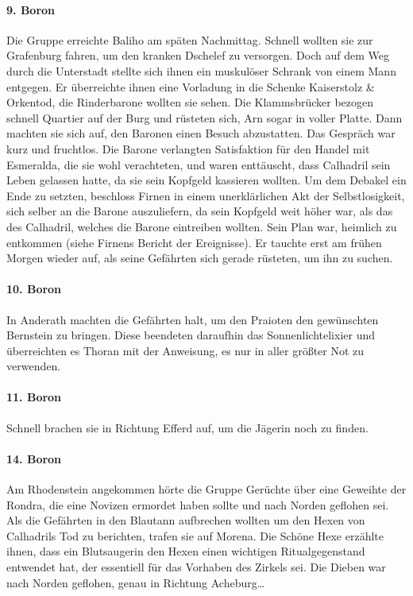 \paragraph{9. Boron}
Die Gruppe erreichte Baliho am späten Nachmittag. Schnell wollten sie zur Grafenburg fahren, um den kranken Dschelef zu versorgen. Doch auf dem Weg durch die Unterstadt stellte sich ihnen ein muskulöser Schrank von einem Mann entgegen. Er überreichte ihnen eine Vorladung in die Schenke Kaiserstolz \& Orkentod, die Rinderbarone wollten sie sehen. Die Klammsbrücker bezogen schnell Quartier auf der Burg und rüsteten sich, Arn sogar in voller Platte. Dann machten sie sich auf, den Baronen einen Besuch abzustatten.
Das Gespräch war kurz und fruchtlos. Die Barone verlangten Satisfaktion für den Handel mit Esmeralda, die sie wohl verachteten, und waren enttäuscht, dass Calhadril sein Leben gelassen hatte, da sie sein Kopfgeld kassieren wollten. Um dem Debakel ein Ende zu setzten, beschloss Firnen in einem unerklärlichen Akt der Selbstlosigkeit, sich selber an die Barone auszuliefern, da sein Kopfgeld weit höher war, als das des Calhadril, welches die Barone eintreiben wollten. Sein Plan war, heimlich zu entkommen (siehe Firnens Bericht der Ereignisse).
Er tauchte erst am frühen Morgen wieder auf, als seine Gefährten sich gerade rüsteten, um ihn zu suchen.

\paragraph{10. Boron}
In Anderath machten die Gefährten halt, um den Praioten den gewünschten Bernstein zu bringen. Diese beendeten daraufhin das Sonnenlichtelixier und überreichten es Thoran mit der Anweisung, es nur in aller größter Not zu verwenden.

\paragraph{11. Boron}
Schnell brachen sie in Richtung Efferd auf, um die Jägerin noch zu finden.

\paragraph{14. Boron}
Am Rhodenstein angekommen hörte die Gruppe Gerüchte über eine Geweihte der Rondra, die eine Novizen ermordet haben sollte und nach Norden geflohen sei. Als die Gefährten in den Blautann aufbrechen wollten um den Hexen von Calhadrils Tod zu berichten, trafen sie auf Morena. Die Schöne Hexe erzählte ihnen, dass ein Blutsaugerin den Hexen einen wichtigen Ritualgegenstand entwendet hat, der essentiell für das Vorhaben des Zirkels sei. Die Dieben war nach Norden geflohen, genau in Richtung Acheburg\dots 



